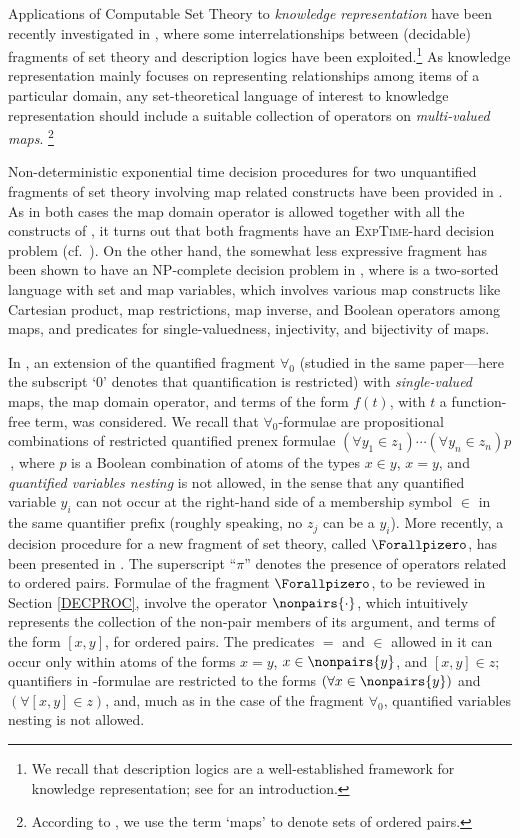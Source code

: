 \documentclass[submission,copyright,creativecommons]{eptcs}
\newcommand{\corr}[1]{#1}
\begin{document}
Applications of Computable Set Theory to \emph{knowledge
representation} have been recently investigated in
\cite{CanLonPis2010, CanLonNic2011}, where some interrelationships
between (decidable) fragments of set theory and description logics
have been exploited.\footnote{We recall that description logics are a
well-established framework for knowledge representation; see
\cite{DLHANDBOOK2} for an introduction.}
As knowledge representation mainly focuses on representing
relationships among items of a particular domain, any set-theoretical
language of interest to knowledge representation should include a
suitable collection of operators on \emph{multi-valued
maps}.
\footnote{According to \cite{SchDewSchDub1986}, we use the term
`maps' to denote sets of ordered pairs.}

Non-deterministic exponential time decision procedures for two
unquantified fragments of set theory involving map related constructs
have been provided in \cite{FOS80, CanSch91}.  As in both
cases the map domain operator is allowed together with all the
constructs of \mls, it turns out that both fragments have an
\textsc{ExpTime}-hard decision problem (cf.\ \cite{CanLonNic2010}).
On the other hand, the somewhat less expressive fragment \mlsscart has
been shown to have an \textsc{NP}-complete decision problem in
\cite{CanLonNic2010}, where \mlsscart is a two-sorted
language with set and map variables, which involves various map
constructs like Cartesian product, map restrictions, map inverse, and
Boolean operators among maps, and predicates for single-valuedness,
injectivity, and bijectivity of maps.

In \cite{BreFerOmoSch1981}, an extension of the quantified fragment
$\forall_{0}$ (studied in the same paper---here the subscript `$0$' 
denotes that quantification is restricted) with \emph{single-valued}
maps, the map domain operator, and terms of the form $f(t)$, with $t$
a function-free term, was considered.  We recall that
$\forall_{0}$-formulae are propositional combinations of restricted
quantified prenex formulae
$(\forall y_1 \in z_1) \cdots (\forall y_n \in z_n)p$\,,
where $p$ is a Boolean combination of atoms of the types $x \in y$,
$x=y$, \corr{and \emph{quantified variables nesting} is not allowed, in the 
sense that any quantified variable $y_i$ can not occur at the
right-hand side of a membership symbol $\in$ in the same quantifier prefix
(roughly speaking, no $z_j$ can be a $y_i$)}. 
More recently, a decision procedure for a new fragment of set theory,
called $\Forallpizero$, has been presented in \cite{CanLonNic2011}.
\corr{The superscript ``$\pi$'' denotes the presence of operators
related to ordered pairs.} Formulae of the fragment $\Forallpizero$,
to be reviewed in Section \ref{DECPROC}, involve the operator
$\nonpairs{\cdot}$, which intuitively represents the collection of the
non-pair members of its argument, and terms of the form $[x,y]$, for
ordered pairs.  The predicates $=$ and $\in$ allowed in it can occur
only within atoms of the forms $x=y$, $x \in \nonpairs{y}$, and $[x,y]
\in z$; quantifiers in \Forallpizero-formulae are restricted to the
forms $(\forall x \in \nonpairs{y})$ and $(\forall [x,y] \in z)$, and,
much as in the case of the fragment $\forall_{0}$, quantified
variables nesting is not allowed.
\end{document}
